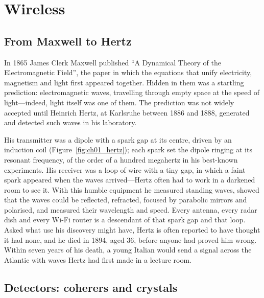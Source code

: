 \section{Wireless}
\label{sec:ch01:wireless}

\subsection{From Maxwell to Hertz}

In 1865 James Clerk Maxwell published ``A Dynamical Theory of the Electromagnetic Field'', the paper
in which the equations that unify electricity, magnetism and light first appeared together. Hidden in
them was a startling prediction: electromagnetic waves, travelling through empty space at the speed of
light---indeed, light itself was one of them. The prediction was not widely accepted until Heinrich
Hertz, at Karlsruhe between 1886 and 1888, generated and detected such waves in his laboratory.


His transmitter was a dipole with a spark gap at its centre, driven by an induction coil
(Figure~\ref{fig:ch01_hertz}); each spark set the dipole ringing at its resonant frequency, of the
order of a hundred megahertz in his best-known experiments. His receiver was a loop of wire with a
tiny gap, in which a faint spark appeared when the waves arrived---Hertz often had to work in a
darkened room to see it. With this humble equipment he measured standing waves, showed that the waves
could be reflected, refracted, focused by parabolic mirrors and polarised, and measured their
wavelength and speed. Every antenna, every radar dish and every Wi-Fi router is a descendant of that
spark gap and that loop. Asked what use his discovery might have, Hertz is often reported to have
thought it had none, and he died in 1894, aged 36, before anyone had proved him wrong. Within seven
years of his death, a young Italian would send a signal across the Atlantic with waves Hertz had
first made in a lecture room.

\subsection{Detectors: coherers and crystals}

